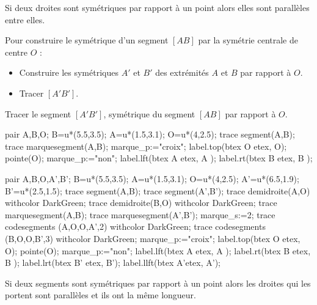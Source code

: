 \begin{propriete}[\admise]
    Si deux droites sont symétriques par rapport à un point alors elles sont parallèles entre elles.
\end{propriete}

\begin{methode}
    Pour construire le symétrique d'un segment $[AB]$ par la symétrie centrale de centre $O$ :
    \begin{itemize}
        \item Construire les symétriques $A'$ et $B'$ des extrémités $A$ et $B$ par rapport à $O$.
        \item Tracer $[A'B']$.
    \end{itemize}
    \exercice
    Tracer le segment $[A'B']$, symétrique du segment $[AB]$ par rapport à $O$.
    
    \bigskip
    \begin{Geometrie}[CoinHD={(8u,4u)}]
        pair A,B,O;
        B=u*(5.5,3.5);
        A=u*(1.5,3.1);
        O=u*(4,2.5);
        trace segment(A,B);
        trace marquesegment(A,B);
        marque_p:="croix";
        label.top(btex O etex, O);
        pointe(O);
        marque_p:="non";
        label.lft(btex A etex, A );
        label.rt(btex B etex, B );
    \end{Geometrie}
    \correction
    \begin{Geometrie}[CoinHD={(8u,4u)}]
        pair A,B,O,A',B';
        B=u*(5.5,3.5);
        A=u*(1.5,3.1);
        O=u*(4,2.5);
        A'=u*(6.5,1.9);
        B'=u*(2.5,1.5);
        trace segment(A,B);
        trace segment(A',B');
        trace demidroite(A,O) withcolor DarkGreen;
        trace demidroite(B,O) withcolor DarkGreen;
        trace marquesegment(A,B);
        trace marquesegment(A',B');
        marque_s:=2;
        trace codesegments (A,O,O,A',2) withcolor DarkGreen;
        trace codesegments (B,O,O,B',3) withcolor DarkGreen;
        marque_p:="croix";
        label.top(btex O etex, O);
        pointe(O);
        marque_p:="non";
        label.lft(btex A etex, A );
        label.rt(btex B etex, B );
        label.lrt(btex B' etex, B');
        label.llft(btex A'etex, A');
    \end{Geometrie}
\end{methode}

\begin{propriete}[\admise]
    Si deux segments sont symétriques par rapport à un point alors les droites qui les portent sont parallèles et ils ont la même longueur.
\end{propriete}

